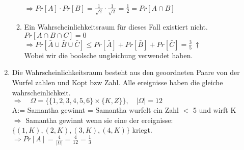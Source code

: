 \documentclass{report}
\begin{document}
\begin{enumerate}[label = \alph*)]
\begin{enumerate}[label = \arabic*.]
$\Rightarrow Pr[A] \cdot Pr[B] = \frac{1}{\sqrt{2}} \cdot \frac{1}{\sqrt{2}} = \frac{1}{2} = Pr[A\cap B]$
\item Ein Wahrscheinlichkeitsraum für dieses Fall existiert nicht.\\
$Pr[A \cap B \cap C] = 0$
$\Rightarrow Pr[\bar{A} \cup \bar{B} \cup \bar{C}] \leq Pr[\bar{A}] + Pr[\bar{B}] + Pr[\bar{C}] = \frac{3}{5} \ \dagger$ \\
Wobei wir die boolsche ungleichung verwendet haben. 
\end{enumerate}
\item Die Wahrscheinlichkeitsraum besteht aus den geoordneten Paare von der Wurfel zahlen und Kopt bzw Zahl. Alle ereignisse haben die gleiche wahrscheinlichkeit.\\
$\Rightarrow \quad \Omega = \{ \{1,2,3,4,5,6\} \times \{K,Z\} \}, \quad |\Omega| = 12$\\
A:= Samantha gewinnt = Samantha wurfelt ein Zahl $<$ 5 und wirft K\\
$\Rightarrow$ Samantha gewinnt wenn sie eine der ereignisse: $\{(1,K),(2,K),(3,K),(4,K)\}$ kriegt.\\
$\Rightarrow Pr[A] = \frac{4}{|\Omega|} = \frac{4}{12} = \frac{1}{3}$
\end{enumerate}
\end{document}
